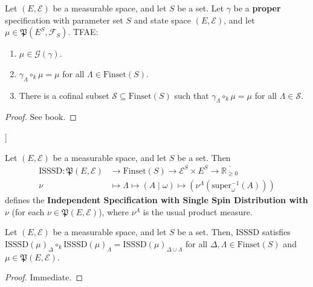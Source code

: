\begin{lemma}
    \label{lem:gibbs-measure-char}

    Let $(E, \mathcal{E})$ be a measurable space, and let $S$ be a set. Let $\gamma$ be a \textbf{proper} specification with parameter set $S$ and state space $(E, \mathcal{E})$, and let $\mu\in\mathfrak{P}(E^S, \mathcal{F}_S)$. TFAE:
    \begin{enumerate}
        \item $\mu\in\mathcal{G}(\gamma)$.
        \item $\gamma_\Lambda\circ_k\mu=\mu$ for all $\Lambda\in\text{Finset}(S)$.
        \item There is a cofinal subset $\mathcal{S}\subseteq\text{Finset}(S)$ such that $\gamma_\Lambda\circ_k\mu=\mu$ for all $\Lambda\in\mathcal{S}$.
    \end{enumerate}
\end{lemma}
\begin{proof}
  See book.
\end{proof}

\begin{definition}[Independent Specification with Single Spin Distribution [ISSSD]]
    \label{def:ISSSD}

    Let $(E, \mathcal{E})$ be a measurable space, and let $S$ be a set. Then
    \begin{align*}
        \text{ISSSD}:\mathfrak{P}(E, \mathcal{E})&\to\text{Finset}(S)\to\mathcal{E}^S\times E^S\to\overline{\mathbb{R}_{\geq0}}\\
        \nu&\mapsto\Lambda\mapsto(A\mid\omega)\mapsto\left(\nu^\Lambda\left(\text{super}_\omega^{-1}(A)\right)\right)
    \end{align*}
    defines the \textbf{Independent Specification with Single Spin Distribution with $\nu$} (for each $\nu\in\mathfrak{P}(E, \mathcal{E})$), where $\nu^\Lambda$ is the usual product measure.
\end{definition}

\begin{lemma}
    \label{lem:isssd-strong-consistency}

    Let $(E, \mathcal{E})$ be a measurable space, and let $S$ be a set. Then, $\text{ISSSD}$ satisfies $\text{ISSSD}(\mu)_\Delta\circ_k\text{ISSSD}(\mu)_\Lambda=\text{ISSSD}(\mu)_{\Delta\cup\Lambda}$ for all $\Delta, \Lambda\in\text{Finset}(S)$ and $\mu\in\mathfrak{P}(E, \mathcal{E})$.
\end{lemma}
\begin{proof}
  Immediate.
\end{proof}

